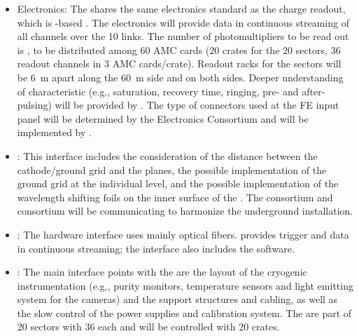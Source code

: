 
\begin{itemize}

\item {} Electronics: The  shares the same  electronics standard as the charge readout, which is -based \cite{utca}. The  electronics will provide data in continuous streaming %
of all  channels over the \SI{10}{\Gbps} links. The number of photomultipliers to be read out is \dpnumpmtch, to be distributed among \num{60} AMC cards (\num{20}  crates for the \num{20}  sectors, \num{36} readout channels in \num{3} AMC cards/crate). Readout racks for the sectors will be \SI{6}{\m} apart along the \SI{60}{\m} side and on both sides. Deeper understanding of  characteristic (e.g., saturation, recovery time, ringing, pre- and after-pulsing) will be provided by  . The type of connectors used at the FE input panel will be determined by the  Electronics Consortium and will be implemented by  .

\item {}: This interface includes the consideration of the distance between the cathode/ground grid and the  planes, the possible implementation of the ground grid at the individual  level, and the possible implementation of the wavelength shifting foils on the inner surface of the . The  consortium and  consortium will be communicating to harmonize the underground installation.

\item {}: The hardware interface uses mainly optical fibers.   provides trigger and data in continuous streaming;  the interface also includes the  software.

\item {}: The main interface points with the  are the layout of the cryogenic instrumentation (e.g., purity monitors, temperature sensors and light emitting system for the cameras) and the  support structures and cabling, as well as the slow control of the  power supplies and calibration system. The   are part of \num{20} sectors with \num{36}  each and will be controlled with \num{20}  crates.


\end{itemize}
